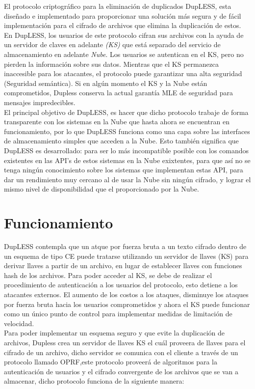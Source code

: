 El protocolo criptográfico para la eliminación de duplicados DupLESS, esta diseñado e implementado para proporcionar una solución más segura y de fácil implementación para el cifrado de archivos que elimina la duplicación de estos. En DupLESS, los usuarios de este protocolo cifran sus archivos con la ayuda de un servidor de claves en adelante \textit{(KS)} que está separado del servicio de almacenamiento en adelante  \textit{Nube}. Los usuarios se autentican en el KS, pero no pierden la información sobre sus datos. Mientras que el KS permanezca inaccesible para los atacantes, el protocolo puede garantizar una alta seguridad (Seguridad semántica). Si en algún momento el KS y la Nube están comprometidos, Dupless conserva la actual garantía MLE de seguridad para mensajes impredecibles.\\ 

El principal objetivo de DupLESS, es hacer que dicho protocolo trabaje de forma transparente con los sistemas en la Nube que hasta ahora se encuentran en funcionamiento, por lo que DupLESS funciona como una capa sobre las interfaces de almacenamiento simples que acceden a la Nube. Esto también significa que DupLESS es desarrollado: para ser lo más incompatible posible con los comandos existentes en las API's de estos sistemas en la Nube exixtentes, para que así no se tenga ningún conocimiento sobre los sistemas que implementan estas API, para dar un rendimiento muy cercano al de usar la Nube sin ningún cifrado, y lograr el mismo nivel de disponibilidad que el proporcionado por la Nube.


\section{Funcionamiento}

DupLESS contempla que un atque por fuerza bruta a un texto cifrado dentro de un esquema de tipo CE puede tratarse utilizando un servidor de llaves (KS) para derivar llaves a partir de un archivo, en lugar de establecer llaves con funciones hash de los archivos. Para poder acceder al KS, se debe de realizar el procedimiento de autenticación a los usuarios del protocolo, esto detiene a los atacantes externos. El aumento de los costos a los ataques, disminuye los ataques por fuerza bruta hacia los usuarios comprometidos y ahora el KS puede funcionar como un único punto de control para implementar medidas de limitación de velocidad. \\

Para poder implementar un esquema seguro y que evite la duplicación de archivos, Dupless crea un servidor de llaves KS el cuál proveera de llaves para el cifrado de un archivo, dicho servidor se comunica con el cliente a través de un protocolo llamado OPRF,este protocolo proveerá de algoritmos para la autenticación de usuarios y el cifrado convergente de los archivos que se van a almacenar, dicho protocolo funciona de la siguiente manera: \\ 

